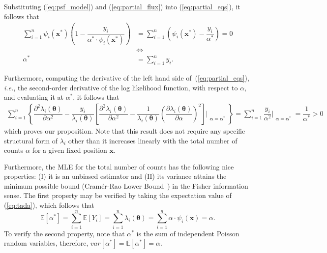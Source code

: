 \documentclass{rnaastex}
\begin{document}
Substituting (\ref{eq:psf_model}) and (\ref{eq:partial_flux}) into (\ref{eq:partial_eqs}), it follows that
\begin{align}
    \sum_{i=1}^{n} \psi_i(\bm{x}^{*})\left(1 - \dfrac{y_i}{\alpha^{*}\cdot\psi_i(\bm{x}^{*})} \right) &= \sum_{i=1}^{n} \left(\psi_i(\bm{x}^{*}) -  \dfrac{y_i}{\alpha^{*}}\right) = 0 \\
    & \Leftrightarrow \nonumber\\
    \alpha^{*} &= \sum_{i=1}^{n} y_i.
    \label{eq:tada}
\end{align}

Furthermore, computing the derivative of the left hand side of~(\ref{eq:partial_eqs}), \textit{i.e.}, the second-order derivative of the log likelihood function, with respect to $\alpha$, and evaluating it at $\alpha^{*}$, it follows that
\begin{align}
    \sum_{i=1}^{n}\left\{\dfrac{\partial^2 \lambda_i\left(\bm{\theta}\right)}{\partial \alpha^2}
    - \dfrac{y_i}{\lambda_i\left(\bm{\theta}\right)}\left[\dfrac{\partial^2 \lambda_i
    \left(\bm{\theta}\right)}{\partial \alpha^2} - \dfrac{1}{\lambda_i\left(\bm{\theta}\right)}
    \left(\dfrac{\partial \lambda_i\left(\bm{\theta}\right)}{\partial \alpha}\right)^2\right]\Bigr|_{\substack{\bm{\alpha}=\bm{\alpha}^{*}}}\right\} = \sum_{i=1}^{n}\dfrac{y_i}{\alpha^2}\Bigr|_{\substack{\bm{\alpha}=\bm{\alpha}^{*}}} = \dfrac{1}{\alpha^{*}} > 0
    \label{eq:partial2_eqs}
\end{align}
which proves our proposition. Note that this result does not require any specific structural form of $\lambda_i$ other than it increases linearly with the total number of counts $\alpha$ for a given fixed position $\bm{x}$.

Furthermore, the MLE for the total number of counts has the following nice properties: (\textrm{I}) it is an unbiased estimator and (\textrm{II}) its variance attains the minimum possible bound (Cram\'er-Rao Lower Bound~\citep{bobrovsky:1987}) in the Fisher information sense. The first property may be verified by taking the expectation value of (\ref{eq:tada}), which follows that
\begin{equation}
    \mathbb{E}\left[\alpha^{*}\right] = \sum_{i=1}^{n}\mathbb{E}[Y_i] = \sum_{i=1}^{n} \lambda_i(\bm{\theta}) = \sum_{i=1}^{n} \alpha\cdot\psi_i(\bm{x}) = \alpha.
\end{equation}
To verify the second property, note that $\alpha^{*}$ is the sum of independent Poisson random variables, therefore, $var\left[\alpha^{*}\right] = \mathbb{E}\left[\alpha^{*}\right] = \alpha$.
\end{document}
